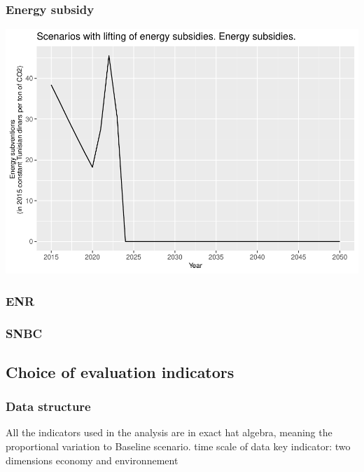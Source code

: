 \documentclass[
]{article}
\begin{document}
\hypertarget{energy-subsidy}{%
\subsubsection{Energy subsidy}\label{energy-subsidy}}

\includegraphics{Modele-ThreeMe-Tunisie_Sequeira_Valilou_Wang_files/figure-latex/unnamed-chunk-7-1.pdf}

\hypertarget{enr}{%
\subsubsection{ENR}\label{enr}}

\hypertarget{snbc}{%
\subsubsection{SNBC}\label{snbc}}

\hypertarget{choice-of-evaluation-indicators}{%
\subsection{Choice of evaluation
indicators}\label{choice-of-evaluation-indicators}}

\hypertarget{data-structure}{%
\subsubsection{Data structure}\label{data-structure}}

All the indicators used in the analysis are in exact hat algebra,
meaning the proportional variation to Baseline scenario. time scale of
data key indicator: two dimensions economy and environnement
\end{document}

